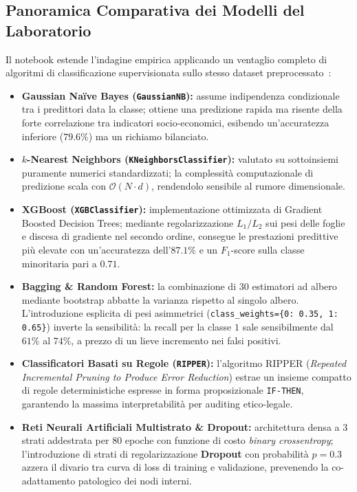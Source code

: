 \FloatBarrier
\subsection{Panoramica Comparativa dei Modelli del Laboratorio}
\label{subsec:dm-lab-comparison}

Il notebook estende l'indagine empirica applicando un ventaglio completo di algoritmi di classificazione supervisionata sullo stesso dataset preprocessato~\cite{mannocci2026imbalanced}:
\begin{itemize}
    \item \textbf{Gaussian Naïve Bayes (\texttt{GaussianNB}):} assume indipendenza condizionale tra i predittori data la classe; ottiene una predizione rapida ma risente della forte correlazione tra indicatori socio-economici, esibendo un'accuratezza inferiore ($79.6\%$) ma un richiamo bilanciato.
    \item \textbf{$k$-Nearest Neighbors (\texttt{KNeighborsClassifier}):} valutato su sottoinsiemi puramente numerici standardizzati; la complessità computazionale di predizione scala con $\mathcal{O}(N \cdot d)$, rendendolo sensibile al rumore dimensionale.
    \item \textbf{XGBoost (\texttt{XGBClassifier}):} implementazione ottimizzata di Gradient Boosted Decision Trees; mediante regolarizzazione $L_1/L_2$ sui pesi delle foglie e discesa di gradiente nel secondo ordine, consegue le prestazioni predittive più elevate con un'accuratezza dell'$87.1\%$ e un $F_1$-score sulla classe minoritaria pari a $0.71$.
    \item \textbf{Bagging \& Random Forest:} la combinazione di $30$ estimatori ad albero mediante bootstrap abbatte la varianza rispetto al singolo albero. L'introduzione esplicita di pesi asimmetrici (\texttt{class\_weights=\{0: 0.35, 1: 0.65\}}) inverte la sensibilità: la recall per la classe $1$ sale sensibilmente dal $61\%$ al $74\%$, a prezzo di un lieve incremento nei falsi positivi.
    \item \textbf{Classificatori Basati su Regole (\texttt{RIPPER}):} l'algoritmo RIPPER (\textit{Repeated Incremental Pruning to Produce Error Reduction}) estrae un insieme compatto di regole deterministiche espresse in forma proposizionale \texttt{IF-THEN}, garantendo la massima interpretabilità per auditing etico-legale.
    \item \textbf{Reti Neurali Artificiali Multistrato \& Dropout:} architettura densa a 3 strati addestrata per 80 epoche con funzione di costo \textit{binary crossentropy}; l'introduzione di strati di regolarizzazione \textbf{Dropout} con probabilità $p = 0.3$ azzera il divario tra curva di loss di training e validazione, prevenendo la co-adattamento patologico dei nodi interni.
\end{itemize}
\FloatBarrier
